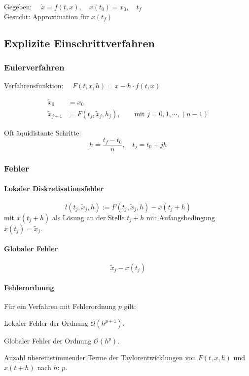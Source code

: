 	Gegeben: $\quad \dot x = f(t,x), \quad x(t_0 ) = x_0, \quad t_f $ \\
	Gesucht: Approximation für $x(t_f)$

	\subsection{Explizite Einschrittverfahren}
		\subsubsection{Eulerverfahren}
			Verfahrensfunktion: $\quad F(t,x,h) = x + h\cdot f(t,x)$

			\begin{algo}
				\begin{align*}
					\tilde x_0 &= x_0 \\
					\tilde x_{j+1} &= F(t_j,\tilde x_j, h_j), \qquad \text{mit } j=0,1,\cdots, (n-1)
				\end{align*}

				Oft äquidistante Schritte:
				\[
					h=\frac{t_f-t_0}{n}, \quad t_j = t_0 + jh
				\]
			\end{algo}

		\subsubsection{Fehler}
			\paragraph{Lokaler Diskretisationsfehler}
				\[
					l(t_j,\tilde x_j,h) := F(t_j,\tilde x_j, h)-\overline{x}(t_j+h)
				\]
				mit $\overline{x}(t_j+h)$ als Lösung an der Stelle $t_j+h$ mit Anfangsbedingung $\overline{x}(t_j)=\tilde x_j$.

			\paragraph{Globaler Fehler}
				\[
					\tilde x_j - x(t_j)
				\]

			\paragraph{Fehlerordnung} Für ein Verfahren mit Fehlerordnung $p$ gilt:
				\begin{tightitemize}
					\item Lokaler Fehler der Ordnung $\mathcal{O}\left(h^{p+1}\right)$.
					\item Globaler Fehler der Ordnung $\mathcal{O}\left(h^{p}\right)$.
					\item Anzahl übereinstimmender Terme der Taylorentwicklungen von $F(t,x,h)$ und $x(t+h)$ nach $h$: $p$.
				\end{tightitemize}

